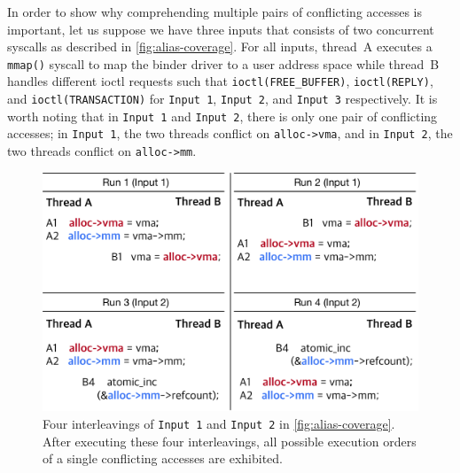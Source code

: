 %
In order to show why comprehending multiple pairs of conflicting
accesses is important, let us suppose we have three inputs that
consists of two concurrent syscalls as described in
\autoref{fig:alias-coverage}.
%
For all inputs, thread~A executes a \texttt{mmap()} syscall to map the
binder driver to a user address space while thread~B handles different
ioctl requests such that \texttt{ioctl(FREE_BUFFER)},
\texttt{ioctl(REPLY)}, and \texttt{ioctl(TRANSACTION)} for
\texttt{Input 1}, \texttt{Input 2}, and \texttt{Input 3} respectively.
%
It is worth noting that in \texttt{Input 1} and \texttt{Input 2},
there is only one pair of conflicting accesses; in \texttt{Input 1},
the two threads conflict on \texttt{alloc->vma}, and in \texttt{Input
  2}, the two threads conflict on \texttt{alloc->mm}.



\begin{figure}[t]
  \centering
  \includegraphics[width=0.9\linewidth]{fig/alias-coverage-interleaving.pdf}
  \caption{Four interleavings of \texttt{Input 1} and \texttt{Input 2}
    in \autoref{fig:alias-coverage}. After executing these four
    interleavings, all possible execution orders of a single
    conflicting accesses are exhibited.}
  \label{fig:alias-coverage-interleaving}
\end{figure}

